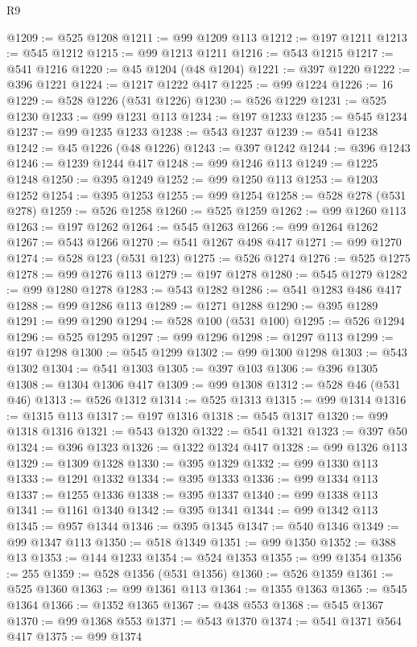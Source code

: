 \begin{lexlean}{R9}
\begin{coremodule}
@1209 := @525 @1208
@1211 := @99 @1209 @113
@1212 := @197 @1211
@1213 := @545 @1212
@1215 := @99 @1213 @1211
@1216 := @543 @1215
@1217 := @541 @1216
@1220 := @45 @1204 (@48 @1204)
@1221 := @397 @1220
@1222 := @396 @1221
@1224 := @1217 @1222 @417
@1225 := @99 @1224
@1226 := 16
@1229 := @528 @1226 (@531 @1226)
@1230 := @526 @1229
@1231 := @525 @1230
@1233 := @99 @1231 @113
@1234 := @197 @1233
@1235 := @545 @1234
@1237 := @99 @1235 @1233
@1238 := @543 @1237
@1239 := @541 @1238
@1242 := @45 @1226 (@48 @1226)
@1243 := @397 @1242
@1244 := @396 @1243
@1246 := @1239 @1244 @417
@1248 := @99 @1246 @113
@1249 := @1225 @1248
@1250 := @395 @1249
@1252 := @99 @1250 @113
@1253 := @1203 @1252
@1254 := @395 @1253
@1255 := @99 @1254
@1258 := @528 @278 (@531 @278)
@1259 := @526 @1258
@1260 := @525 @1259
@1262 := @99 @1260 @113
@1263 := @197 @1262
@1264 := @545 @1263
@1266 := @99 @1264 @1262
@1267 := @543 @1266
@1270 := @541 @1267 @498 @417
@1271 := @99 @1270
@1274 := @528 @123 (@531 @123)
@1275 := @526 @1274
@1276 := @525 @1275
@1278 := @99 @1276 @113
@1279 := @197 @1278
@1280 := @545 @1279
@1282 := @99 @1280 @1278
@1283 := @543 @1282
@1286 := @541 @1283 @486 @417
@1288 := @99 @1286 @113
@1289 := @1271 @1288
@1290 := @395 @1289
@1291 := @99 @1290
@1294 := @528 @100 (@531 @100)
@1295 := @526 @1294
@1296 := @525 @1295
@1297 := @99 @1296
@1298 := @1297 @113
@1299 := @197 @1298
@1300 := @545 @1299
@1302 := @99 @1300 @1298
@1303 := @543 @1302
@1304 := @541 @1303
@1305 := @397 @103
@1306 := @396 @1305
@1308 := @1304 @1306 @417
@1309 := @99 @1308
@1312 := @528 @46 (@531 @46)
@1313 := @526 @1312
@1314 := @525 @1313
@1315 := @99 @1314
@1316 := @1315 @113
@1317 := @197 @1316
@1318 := @545 @1317
@1320 := @99 @1318 @1316
@1321 := @543 @1320
@1322 := @541 @1321
@1323 := @397 @50
@1324 := @396 @1323
@1326 := @1322 @1324 @417
@1328 := @99 @1326 @113
@1329 := @1309 @1328
@1330 := @395 @1329
@1332 := @99 @1330 @113
@1333 := @1291 @1332
@1334 := @395 @1333
@1336 := @99 @1334 @113
@1337 := @1255 @1336
@1338 := @395 @1337
@1340 := @99 @1338 @113
@1341 := @1161 @1340
@1342 := @395 @1341
@1344 := @99 @1342 @113
@1345 := @957 @1344
@1346 := @395 @1345
@1347 := @540 @1346
@1349 := @99 @1347 @113
@1350 := @518 @1349
@1351 := @99 @1350
@1352 := @388 @13
@1353 := @144 @1233
@1354 := @524 @1353
@1355 := @99 @1354
@1356 := 255
@1359 := @528 @1356 (@531 @1356)
@1360 := @526 @1359
@1361 := @525 @1360
@1363 := @99 @1361 @113
@1364 := @1355 @1363
@1365 := @545 @1364
@1366 := @1352 @1365
@1367 := @438 @553
@1368 := @545 @1367
@1370 := @99 @1368 @553
@1371 := @543 @1370
@1374 := @541 @1371 @564 @417
@1375 := @99 @1374

\end{coremodule}
\end{lexlean}
